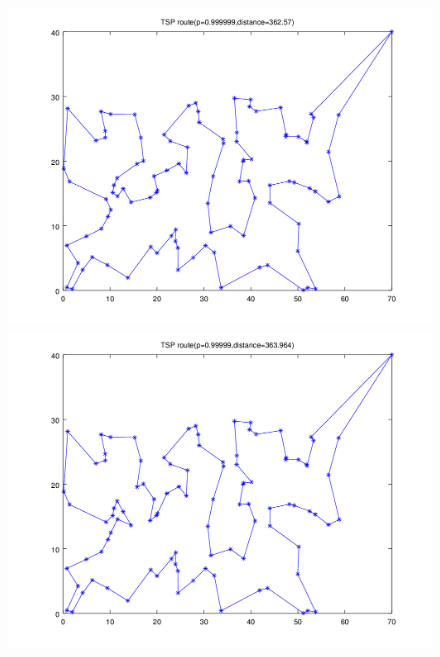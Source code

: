 \documentclass[10.5pt,a4paper]{article}
\begin{document}
\begin{figure}[H]
\begin{minipage}[b]{0.5\linewidth}
\centering
\includegraphics[width=\textwidth]{../result/TSP_route_362.png}
\end{minipage}
\hspace{0.5cm}
\begin{minipage}[b]{0.5\linewidth}
\centering
\includegraphics[width=\textwidth]{../result/TSP_route_363.png}
\end{minipage}
\begin{minipage}[b]{0.5\linewidth}
\centering

\end{minipage}
\end{figure}
\end{document}
